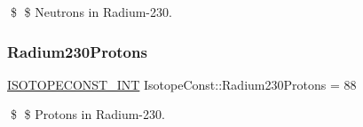 \$ \$ Neutrons in Radium-\/230. \mbox{\label{group___isotope_const-_radium-_ra230_ga3c9dce9a67f2d40699e4c387e2ace47d}} 
\subsubsection{\texorpdfstring{Radium230\+Protons}{Radium230Protons}}
{\footnotesize\ttfamily \mbox{\hyperlink{group___isotope_const-_macros_ga5f18360b3e99483a35c32d789e62621c}{I\+S\+O\+T\+O\+P\+E\+C\+O\+N\+S\+T\+\_\+\+I\+NT}} Isotope\+Const\+::\+Radium230\+Protons = 88}

\$ \$ Protons in Radium-\/230. 